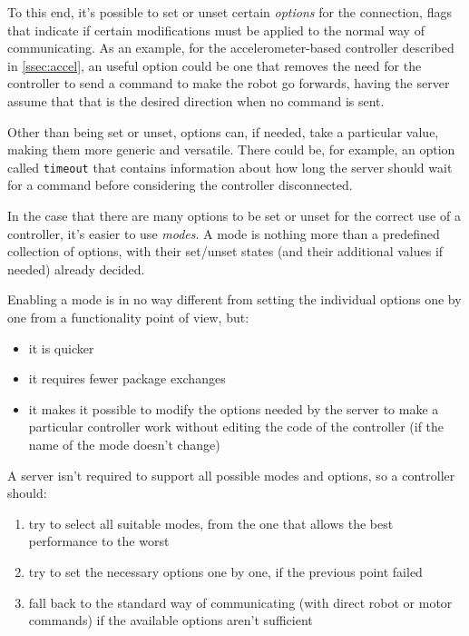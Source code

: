   To this end, it's possible to set or unset certain
  \textit{options} for the connection, flags that indicate if
  certain modifications must be applied to the normal way of
  communicating. As an example, for the accelerometer-based
  controller described in \autoref{ssec:accel}, an useful option could
  be one that removes the need for the controller to send a command
  to make the robot go forwards, having the server assume that that
  is the desired direction when no command is sent.

  Other than being set or unset, options can, if needed, take a
  particular value, making them more generic and versatile. There
  could be, for example, an option called \texttt{timeout} that
  contains information about how long the server should wait for a
  command before considering the controller disconnected.

  In the case that there are many options to be set or unset for the
  correct use of a controller, it's easier to use \textit{modes}. A
  mode is nothing more than a predefined collection of options, with
  their set/unset states (and their additional values if needed)
  already decided.

  \beforelist* Enabling a mode is in no way different from setting the individual
  options one by one from a functionality point of view, but:
  \begin{itemize}
  \item it is quicker
  \item it requires fewer package exchanges
  \item it makes it possible to modify the options needed by the
    server to make a particular controller work without editing the
    code of the controller (if the name of the mode doesn't change)
  \end{itemize}
  \afterlist*
  \beforelist* A server isn't required to support all possible modes and options,
  so a controller should:
  \begin{enumerate}
  \item try to select all suitable modes, from the one that allows
    the best performance to the worst
  \item try to set the necessary options one by one, if the previous
    point failed
  \item fall back to the standard way of communicating (with direct
    robot or motor commands) if the available options aren't
    sufficient
  \end{enumerate}
  \afterlist*
